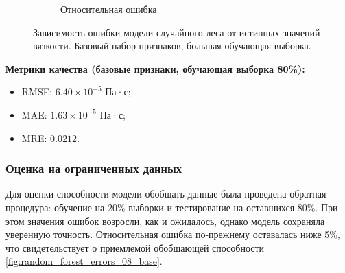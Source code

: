 \documentclass[a4paper,12pt]{article}
\begin{document}
\begin{figure}[ht!]
\begin{subfigure}{0.48\textwidth}
          \caption{Относительная ошибка}
      \end{subfigure}
      \caption{Зависимость ошибки модели случайного леса от истинных значений вязкости. Базовый набор признаков, большая обучающая выборка.}
      \label{fig:random_forest_errors_02_base}
    \end{figure}
    
    \begin{minipage}{\textwidth}
      \textbf{Метрики качества (базовые признаки, обучающая выборка 80\%):}
      \begin{itemize}
          \item RMSE: \( 6.40 \times 10^{-5} \) Па·с;
          \item MAE: \( 1.63 \times 10^{-5} \) Па·с;
          \item MRE: \( 0.0212 \).
      \end{itemize}
    \end{minipage}
    
    \subsubsection{Оценка на ограниченных данных}
    
    Для оценки способности модели обобщать данные была проведена обратная процедура: обучение на 20\% выборки и тестирование на оставшихся 80\%. При этом значения ошибок возросли, как и ожидалось, однако модель сохраняла уверенную точность. Относительная ошибка по-прежнему оставалась ниже 5\%, что свидетельствует о приемлемой обобщающей способности \autoref{fig:random_forest_errors_08_base}.
    
\end{document}
